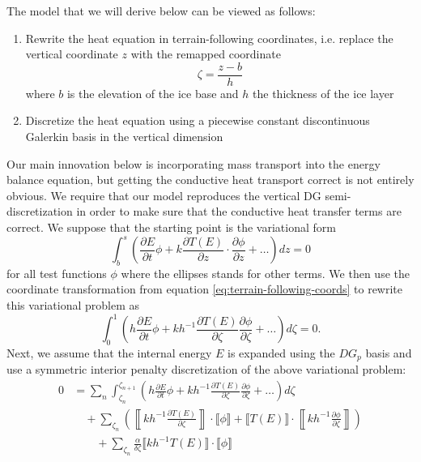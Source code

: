 \documentclass{article}
\theoremstyle{definition}
\theoremstyle{plain}
\begin{document}
The model that we will derive below can be viewed as follows:
\begin{enumerate}
    \item Rewrite the heat equation in terrain-following coordinates, i.e. replace the vertical coordinate $z$ with the remapped coordinate
        \begin{equation}
            \zeta = \frac{z - b}{h}
            \label{eq:terrain-following-coords}
        \end{equation}
        where $b$ is the elevation of the ice base and $h$ the thickness of the ice layer
    \item Discretize the heat equation using a piecewise constant discontinuous Galerkin basis in the vertical dimension
\end{enumerate}
Our main innovation below is incorporating mass transport into the energy balance equation, but getting the conductive heat transport correct is not entirely obvious.
We require that our model reproduces the vertical DG semi-discretization in order to make sure that the conductive heat transfer terms are correct.
We suppose that the starting point is the variational form
\begin{equation}
    \int_b^s\left(\frac{\partial E}{\partial t}\phi + k\frac{\partial T(E)}{\partial z}\cdot\frac{\partial\phi}{\partial z} + \ldots\right)dz = 0
\end{equation}
for all test functions $\phi$ where the ellipses stands for other terms.
We then use the coordinate transformation from equation \eqref{eq:terrain-following-coords} to rewrite this variational problem as
\begin{equation}
    \int_0^1\left(h\frac{\partial E}{\partial t}\phi + kh^{-1}\frac{\partial T(E)}{\partial\zeta}\frac{\partial\phi}{\partial\zeta} + \ldots\right)d\zeta = 0.
\end{equation}
Next, we assume that the internal energy $E$ is expanded using the $DG_p$ basis and use a symmetric interior penalty discretization of the above variational problem:
\begin{align}
    0 & = \sum_n\int_{\zeta_n}^{\zeta_{n + 1}}\left(h\frac{\partial E}{\partial t}\phi + kh^{-1}\frac{\partial T(E)}{\partial\zeta}\frac{\partial\phi}{\partial\zeta} + \ldots\right)d\zeta \nonumber\\
    & \quad + \sum_{\zeta_n}\left(\left\llbracket kh^{-1}\frac{\partial T(E)}{\partial\zeta}\right\rrbracket \cdot\llbracket\phi\rrbracket + \llbracket T(E)\rrbracket\cdot\left\llbracket kh^{-1}\frac{\partial\phi}{\partial\zeta}\right\rrbracket\right)\nonumber\\
    & \qquad + \sum_{\zeta_n}\frac{\alpha}{\delta\zeta}\llbracket kh^{-1}T(E)\rrbracket\cdot\llbracket\phi\rrbracket
\end{align}
\end{document}
